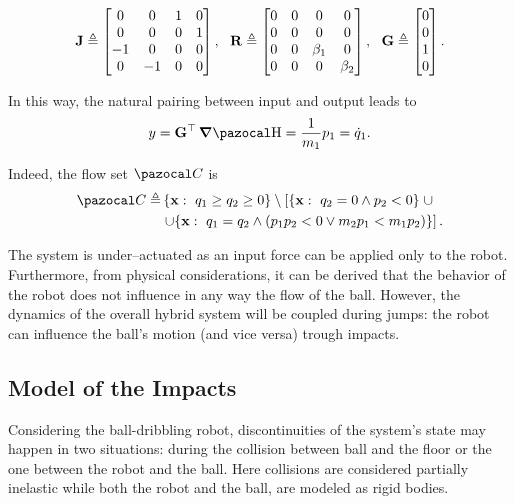 \begin{equation}
    \mathbf{J}\triangleq
    \begin{bmatrix}
        0&0&1&0\\
        0&0&0&1\\
        -1&0&0&0\\
        0&-1&0&0
    \end{bmatrix},~~
    \mathbf{R}\triangleq
    \begin{bmatrix}
        0&0&0&0\\
        0&0&0&0\\
        0&0&\beta_1&0\\
        0&0&0&\beta_2
    \end{bmatrix},~~
    \mathbf{G}\triangleq
    \begin{bmatrix}
        0\\0\\1\\0
    \end{bmatrix}.
\end{equation}
%

In this way, the natural pairing between input and output leads to
%
\begin{equation}
    y = \Gb^\top\dH= \frac{1}{m_1}p_1=\dot{q}_1.
\end{equation}
%

Indeed, the flow set $\C$ is 
%
\begin{align}\label{eq:flowset}
    \C \triangleq &\left\{\xb:~q_1\geq q_2\geq 0\right\}\setminus\left[\left\{\xb:~q_2 = 0\land p_2<0\right\}\right.\cup\nonumber\\
    &\left.\cup\{\xb:~q_1 = q_2\land (p_1p_2<0\lor m_2p_1< m_1p_2)\}\right].
\end{align}
%
\begin{rmk}
    The system is under--actuated as an input force can be applied only to the robot. Furthermore, from physical considerations, it can be derived that the behavior of the robot does not influence in any way the flow of the ball. However, the dynamics of the overall hybrid system will be coupled during jumps: the robot can influence the ball's motion (and vice versa) trough impacts.
\end{rmk}
%
\subsection{Model of the Impacts}
%
Considering the ball-dribbling robot, discontinuities of the system's state may happen in two situations: during the collision between ball and the floor or the one between the robot and the ball. Here collisions are considered partially inelastic while both the robot and the ball, are modeled as rigid bodies.
%
